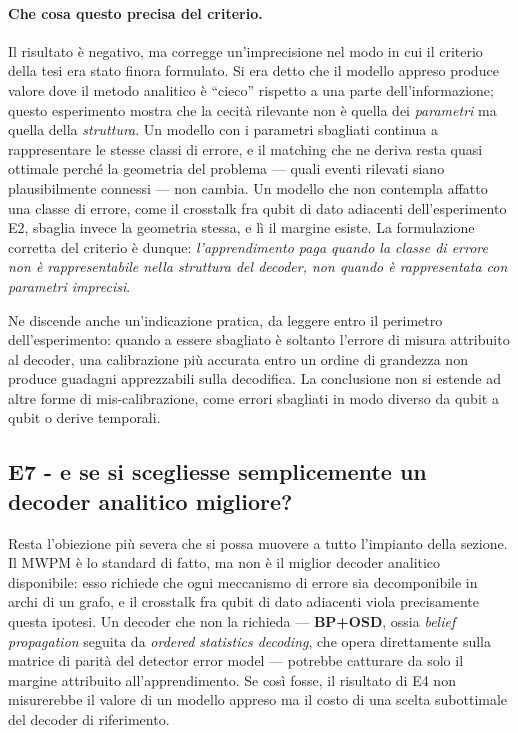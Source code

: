 \paragraph{Che cosa questo precisa del criterio.}
Il risultato è negativo, ma corregge un'imprecisione nel modo in cui il criterio della tesi era stato finora formulato. Si era detto che il modello appreso produce valore dove il metodo analitico è ``cieco'' rispetto a una parte dell'informazione; questo esperimento mostra che la cecità rilevante non è quella dei \emph{parametri} ma quella della \emph{struttura}. Un modello con i parametri sbagliati continua a rappresentare le stesse classi di errore, e il matching che ne deriva resta quasi ottimale perché la geometria del problema --- quali eventi rilevati siano plausibilmente connessi --- non cambia. Un modello che non contempla affatto una classe di errore, come il crosstalk fra qubit di dato adiacenti dell'esperimento E2, sbaglia invece la geometria stessa, e lì il margine esiste. La formulazione corretta del criterio è dunque: \emph{l'apprendimento paga quando la classe di errore non è rappresentabile nella struttura del decoder, non quando è rappresentata con parametri imprecisi}.

Ne discende anche un'indicazione pratica, da leggere entro il perimetro dell'esperimento: quando a essere sbagliato è soltanto l'errore di misura attribuito al decoder, una calibrazione più accurata entro un ordine di grandezza non produce guadagni apprezzabili sulla decodifica. La conclusione non si estende ad altre forme di mis-calibrazione, come errori sbagliati in modo diverso da qubit a qubit o derive temporali.

\subsection[E7 - confronto con un decoder analitico migliore]{E7 - e se si scegliesse semplicemente un decoder analitico migliore?}
\label{subsec:neural_bposd}

Resta l'obiezione più severa che si possa muovere a tutto l'impianto della sezione. Il \ac{MWPM} è lo standard di fatto, ma non è il miglior decoder analitico disponibile: esso richiede che ogni meccanismo di errore sia decomponibile in archi di un grafo, e il crosstalk fra qubit di dato adiacenti viola precisamente questa ipotesi. Un decoder che non la richieda --- \textbf{BP+OSD}, ossia \textit{belief propagation} seguita da \textit{ordered statistics decoding}, che opera direttamente sulla matrice di parità del detector error model \cite{panteleev2021, roffe2020} --- potrebbe catturare da solo il margine attribuito all'apprendimento. Se così fosse, il risultato di E4 non misurerebbe il valore di un modello appreso ma il costo di una scelta subottimale del decoder di riferimento.

